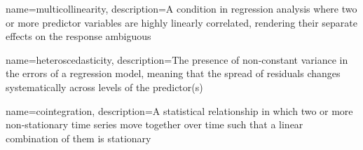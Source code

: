 




{
    name=multicollinearity,
    description={A condition in regression analysis where two or more predictor variables are highly linearly correlated, rendering their separate effects on the response ambiguous}
}

{
    name=heteroscedasticity,
    description={The presence of non‑constant variance in the errors of a regression model, meaning that the spread of residuals changes systematically across levels of the predictor(s)}
}

{
    name=cointegration,
    description={A statistical relationship in which two or more non‑stationary time series move together over time such that a linear combination of them is stationary}
}

\newcommand{\cointegrated}{\glslink{cointegration}{cointegrated}}

